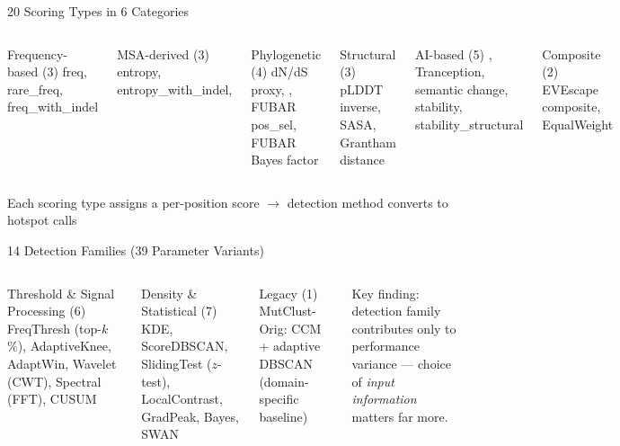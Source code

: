 \begin{frame}{20 Scoring Types in 6 Categories}
  \scriptsize
  \begin{columns}[T]
    \begin{block}{Frequency-based (3)}
      freq, rare\_freq, freq\_with\_indel
    \end{block}
    \begin{block}{MSA-derived (3)}
      entropy, entropy\_with\_indel, 
    \end{block}
    \begin{block}{Phylogenetic (4)}
      dN/dS proxy, , FUBAR pos\_sel, FUBAR Bayes factor
    \end{block}

    \begin{block}{Structural (3)}
      pLDDT inverse, SASA, Grantham distance
    \end{block}
    \begin{block}{AI-based (5)}
      , Tranception, semantic change, stability, stability\_structural
    \end{block}
    \begin{block}{Composite (2)}
      EVEscape composite, EqualWeight
    \end{block}
  \end{columns}

  \vspace{0.5em}
  \centering
  Each scoring type assigns a per-position score $\rightarrow$ detection method converts to hotspot calls
\end{frame}

\begin{frame}{14 Detection Families (39 Parameter Variants)}
  \footnotesize
  \begin{columns}[T]
    \begin{block}{Threshold \& Signal Processing (6)}
      FreqThresh (top-$k$\%), AdaptiveKnee, AdaptWin,
      Wavelet (CWT), Spectral (FFT), CUSUM
    \end{block}
    \begin{block}{Density \& Statistical (7)}
      KDE, ScoreDBSCAN,
      SlidingTest ($z$-test), LocalContrast,
      GradPeak, Bayes, SWAN
    \end{block}

    \begin{block}{Legacy (1)}
      MutClust-Orig: CCM + adaptive DBSCAN
      {\scriptsize (domain-specific baseline)}
    \end{block}

    \vspace{0.5em}
    Key finding: detection family contributes only  to performance variance --- choice of \textit{input information} matters far more.
  \end{columns}
\end{frame}

